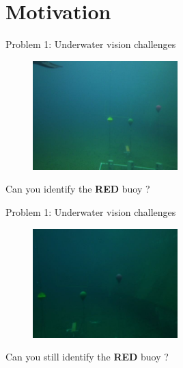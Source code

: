 \documentclass[14pt]{beamer}
\begin{document}
\section{Motivation}

\begin{frame}{Problem 1: Underwater vision challenges}

  \begin{figure}[ht]
      \centering
      \includegraphics[width=0.5\textwidth, height=0.3\textwidth]{figs/problem1_1.png}
  \end{figure}

  Can you identify the {\color{red} \textbf{RED}} buoy ? 

\end{frame}

\begin{frame}{Problem 1: Underwater vision challenges}

  \begin{figure}[ht]
      \centering
      \includegraphics[width=0.5\textwidth, height=0.3\textwidth]{figs/problem1_2.jpg}
  \end{figure}

  Can you still identify the {\color{red} \textbf{RED}} buoy ? 

\end{frame}
\end{document}
